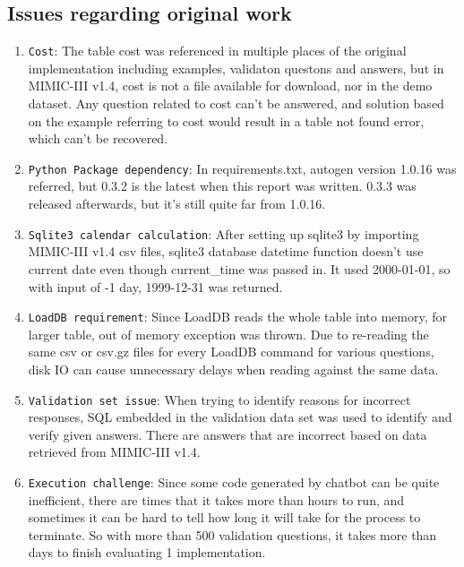 \documentclass[screen,review]{acmart}
\begin{document}
\subsection{Issues regarding original work}
\begin{enumerate}
  \item{\texttt{Cost}}: The table cost was referenced in multiple places of the original implementation including examples, 
  validaton questons and answers, but in MIMIC-III v1.4, cost is not a file available for download, nor in the demo dataset. 
  Any question related to cost can't be answered, and solution based on the example referring to cost would result in 
  a table not found error, which can't be recovered.
  \item{\texttt{Python Package dependency}}: In requirements.txt, autogen version 1.0.16 was referred, but 0.3.2 is the latest 
  when this report was written. 0.3.3 was released afterwards, but it's still quite far from 1.0.16.
  \item{\texttt{Sqlite3 calendar calculation}}: After setting up sqlite3 by importing MIMIC-III v1.4 csv files, 
  sqlite3 database datetime function doesn't use current date even though current\_time was passed in. 
  It used 2000-01-01, so with input of -1 day, 1999-12-31 was returned.
  \item{\texttt{LoadDB requirement}}: Since LoadDB reads the whole table into memory, for larger table, 
  out of memory exception was thrown. Due to re-reading the same csv or csv.gz files for every LoadDB command
  for various questions, disk IO can cause unnecessary delays when reading against the same data.
  \item{\texttt{Validation set issue}}: When trying to identify reasons for incorrect responses, SQL embedded in the validation
  data set was used to identify and verify given answers. There are answers that are incorrect based on data retrieved from MIMIC-III v1.4. 
  \item{\texttt{Execution challenge}}: Since some code generated by chatbot can be quite inefficient, there are times that it 
  takes more than hours to run, and sometimes it can be hard to tell how long it will take for the process to terminate. 
  So with more than 500 validation questions, it takes more than days to finish evaluating 1 implementation.
\end{enumerate}
\end{document}

